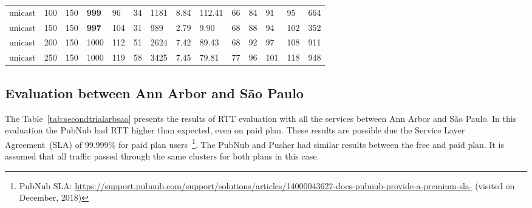 \begin{table}[!htb]
\begin{tabular}{llllllllllllll}
		unicast & 100          & 150   & \textbf{999}  & 96   & 34   & 1181     & 8.84     & 112.41   & 66  & 84   & 91   & 95   & 664   \\
		unicast & 150          & 150   & \textbf{997}  & 104  & 31   & 989      & 2.79     & 9.90     & 68  & 88   & 94   & 102  & 352   \\
		unicast & 200          & 150   & 1000 & 112  & 51   & 2624     & 7.42     & 89.43    & 68  & 92   & 97   & 108  & 911   \\
		unicast & 250          & 150   & 1000 & 119  & 58   & 3425     & 7.45     & 79.81    & 77  & 96   & 101  & 118  & 948  \\ \bottomrule
	\end{tabular}
\end{table}



\subsection*{Evaluation between Ann Arbor and São Paulo} 

The Table~\ref{tab:secondtrialarbsao} presents the results of RTT evaluation with all the services between Ann Arbor and São Paulo.
In this evaluation the PubNub had RTT higher than expected, even on paid plan.
These results are possible due the Service Layer Agreement~(SLA) of 99.999\% for paid plan users~\footnote{PubNub SLA: \url{https://support.pubnub.com/support/solutions/articles/14000043627-does-pubnub-provide-a-premium-sla-} (visited on December, 2018)}. 
The PubNub and Pusher had similar results between the free and paid plan.
It is assumed that all traffic passed through the same clusters for both plans in this case.

